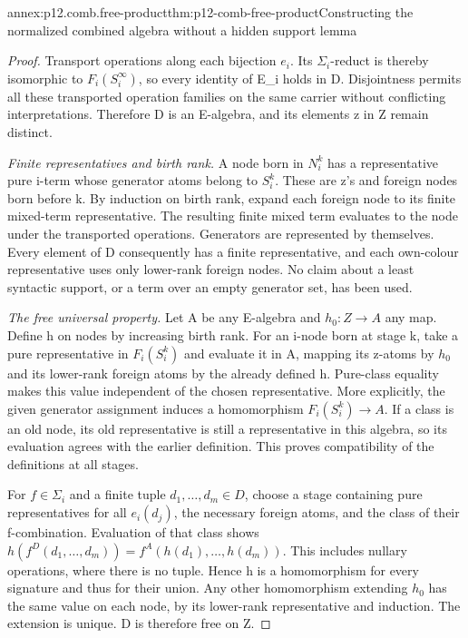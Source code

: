 \begin{annexitem}{annex:p12.comb.free-product}{thm:p12-comb-free-product}{Constructing the normalized combined algebra without a hidden support lemma}
\begin{proof}
Transport operations along each bijection \(e_i\). Its \(\Sigma_i\)-reduct
is thereby isomorphic to \(F_i(S_i^\infty)\), so every identity of
E_i holds in D. Disjointness permits all these transported operation
families on the same carrier without conflicting interpretations.
Therefore D is an E-algebra, and its elements z in Z remain distinct.

\emph{Finite representatives and birth rank.} A node born in
\(N_i^k\) has a representative pure i-term whose generator atoms
belong to \(S_i^k\). These are z's and foreign nodes born before
k. By induction on birth rank, expand each foreign node to its
finite mixed-term representative. The resulting finite mixed term
evaluates to the node under the transported operations. Generators
are represented by themselves. Every element of D consequently has
a finite representative, and each own-colour representative uses
only lower-rank foreign nodes. No claim about a least syntactic
support, or a term over an empty generator set, has been used.

\emph{The free universal property.} Let A be any E-algebra and
\(h_0:Z\to A\) any map. Define h on nodes by increasing birth rank.
For an i-node born at stage k, take a pure representative in
\(F_i(S_i^k)\) and evaluate it in A, mapping its z-atoms by
\(h_0\) and its lower-rank foreign atoms by the already defined h.
Pure-class equality makes this value independent of the chosen
representative. More explicitly, the given generator assignment
induces a homomorphism \(F_i(S_i^k)\to A\). If a class is an old
node, its old representative is still a representative in this
algebra, so its evaluation agrees with the earlier definition.
This proves compatibility of the definitions at all stages.

For \(f\in\Sigma_i\) and a finite tuple \(d_1,\ldots,d_m\in D\),
choose a stage containing pure representatives for all
\(e_i(d_j)\), the necessary foreign atoms, and the class of their
f-combination. Evaluation of that class shows
\(h(f^D(d_1,\ldots,d_m))=f^A(h(d_1),\ldots,h(d_m))\).
This includes nullary operations, where there is no tuple.
Hence h is a homomorphism for every signature and thus for their
union. Any other homomorphism extending \(h_0\) has the same
value on each node, by its lower-rank representative and induction.
The extension is unique. D is therefore free on Z.


\end{proof}
\end{annexitem}
